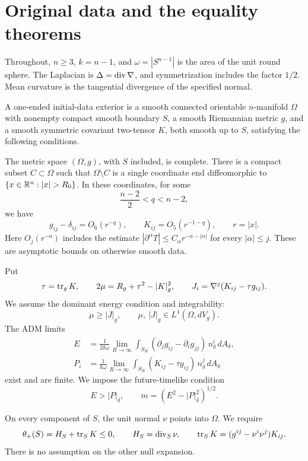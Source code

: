 \section{Original data and the equality theorems}
\label{sec:setting}

Throughout, \(n\ge3\), \(k=n-1\), and
\(\omega=|S^{n-1}|\) is the area of the unit round sphere. The Laplacian
is \(\Delta=\operatorname{div}\nabla\), and symmetrization includes the factor \(1/2\).
Mean curvature is the tangential divergence of the specified normal.

\begin{definition}
\label{def:data}
A one-ended initial-data exterior is a smooth connected orientable
\(n\)-manifold \(\Omega\) with nonempty compact smooth boundary \(S\),
a smooth Riemannian metric \(g\), and a smooth symmetric covariant
two-tensor \(K\), both smooth up to \(S\), satisfying the following
conditions.

The metric space \((\Omega,g)\), with \(S\) included, is complete.
There is a compact subset \(C\subset\Omega\) such that
\(\Omega\setminus C\) is a single coordinate end diffeomorphic to
\(\{x\in\R^n:|x|>R_0\}\). In these coordinates, for some
\[
 \frac{n-2}{2}<q<n-2,
\]
we have
\begin{equation}
 g_{ij}-\delta_{ij}=O_6(r^{-q}),\qquad
 K_{ij}=O_5(r^{-1-q}),\qquad r=|x|.
 \label{eq:setting:decay}
\end{equation}
Here \(O_j(r^{-a})\) includes the estimate
\(|\partial^\alpha T|\le C_\alpha r^{-a-|\alpha|}\) for every
\(|\alpha|\le j\). These are asymptotic bounds on otherwise smooth data.

Put
\begin{equation}
 \tau=\operatorname{tr}_gK,\qquad
 2\mu=R_g+\tau^2-|K|_g^2,\qquad
 J_i=\nabla^j(K_{ij}-\tau g_{ij}).
 \label{eq:setting:constraints}
\end{equation}
We assume the dominant energy condition and integrability:
\begin{equation}
 \mu\ge |J|_g,\qquad
 \mu,\ |J|_g\in L^1(\Omega,dV_g).
 \label{eq:setting:dec}
\end{equation}
The ADM limits
\begin{align}
 E&=\frac{1}{2k\omega}
 \lim_{R\to\infty}\int_{S_R}
   (\partial_jg_{ij}-\partial_ig_{jj})\,n_\delta^i\,dA_\delta,
 \label{eq:setting:energy}\\
 P_i&=\frac{1}{k\omega}
 \lim_{R\to\infty}\int_{S_R}
  (K_{ij}-\tau g_{ij})\,n_\delta^j\,dA_\delta
 \label{eq:setting:momentum}
\end{align}
exist and are finite. We impose the future-timelike condition
\begin{equation}
 E>|P|_\delta,\qquad m=(E^2-|P|_\delta^2)^{1/2}.
 \label{eq:setting:timelike}
\end{equation}

On every component of \(S\), the unit normal \(\nu\) points into
\(\Omega\). We require
\begin{equation}
 \theta_+(S)=H_S+\operatorname{tr}_SK\le0,\qquad
 H_S=\operatorname{div}_S\nu,\qquad
 \operatorname{tr}_SK=(g^{ij}-\nu^i\nu^j)K_{ij}.
 \label{eq:setting:trapping}
\end{equation}
There is no assumption on the other null expansion.
\end{definition}

